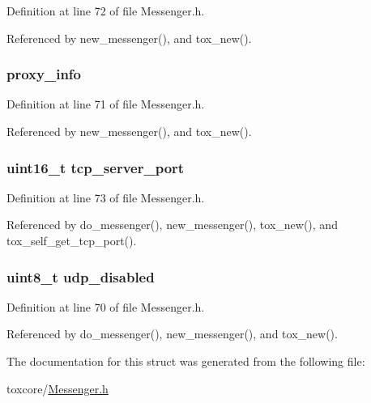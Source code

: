 Definition at line 72 of file Messenger.\+h.



Referenced by new\+\_\+messenger(), and tox\+\_\+new().

\hypertarget{struct_messenger___options_aa737023350cf47e63993e3b4dc9a7472}{
\subsubsection[{proxy\+\_\+info}]{ proxy\+\_\+info}}\label{struct_messenger___options_aa737023350cf47e63993e3b4dc9a7472}


Definition at line 71 of file Messenger.\+h.



Referenced by new\+\_\+messenger(), and tox\+\_\+new().

\hypertarget{struct_messenger___options_a9f404f426cc09060b42b9a61523cc573}{
\subsubsection[{tcp\+\_\+server\+\_\+port}]{\setlength{\rightskip}{0pt plus 5cm}uint16\+\_\+t tcp\+\_\+server\+\_\+port}}\label{struct_messenger___options_a9f404f426cc09060b42b9a61523cc573}


Definition at line 73 of file Messenger.\+h.



Referenced by do\+\_\+messenger(), new\+\_\+messenger(), tox\+\_\+new(), and tox\+\_\+self\+\_\+get\+\_\+tcp\+\_\+port().

\hypertarget{struct_messenger___options_a1510f9751065ec1a6d485c4b3072b9d7}{
\subsubsection[{udp\+\_\+disabled}]{\setlength{\rightskip}{0pt plus 5cm}uint8\+\_\+t udp\+\_\+disabled}}\label{struct_messenger___options_a1510f9751065ec1a6d485c4b3072b9d7}


Definition at line 70 of file Messenger.\+h.



Referenced by do\+\_\+messenger(), new\+\_\+messenger(), and tox\+\_\+new().



The documentation for this struct was generated from the following file\+:\begin{DoxyCompactItemize}
\item 
toxcore/\hyperlink{_messenger_8h}{Messenger.\+h}\end{DoxyCompactItemize}
